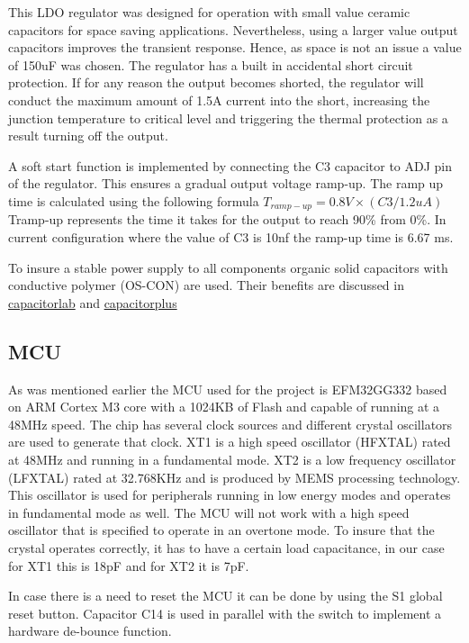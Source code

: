 This LDO regulator was designed for operation with small value ceramic capacitors for space saving applications. Nevertheless, using a larger value output capacitors improves the transient response. Hence, as space is not an issue a value of 150uF was chosen. The regulator has a built in accidental short circuit protection. If for any reason the output becomes shorted, the regulator will conduct the maximum amount of 1.5A current into the short, increasing the junction temperature to critical level and triggering the thermal protection as a result turning off the output. 

A soft start function is implemented by connecting the C3 capacitor to ADJ pin of the regulator. This ensures a gradual output voltage ramp-up. The ramp up time is calculated using the following formula $T_{ramp-up} = 0.8V × (C3/1.2uA)$ Tramp-up represents the time it takes for the output to reach 90\% from 0\%. In current configuration where the value of C3 is 10nf the ramp-up time is 6.67 ms.

To insure a stable power supply to all components organic solid capacitors with conductive polymer (OS-CON) are used. Their benefits are discussed in 
\href{http://www.capacitorlab.com/capacitor-types-polymer/}{capacitorlab}  and  \href{http://www.capacitorsplus.com/whatis.htm}{capacitorplus}


\subsection{MCU}
As was mentioned earlier the MCU used for the project is EFM32GG332 based on ARM Cortex M3 core with a 1024KB of Flash and capable of running at a 48MHz speed. The chip has several clock sources and different crystal oscillators are used to generate that clock. XT1 is a high speed oscillator (HFXTAL) rated at 48MHz and running in a fundamental mode. XT2 is a low frequency oscillator (LFXTAL) rated at 32.768KHz and is produced by MEMS processing technology. This oscillator is used for peripherals running in low energy modes and operates in fundamental mode as well. The MCU will not work with a high speed oscillator that is specified to operate in an overtone mode. To insure that the crystal operates correctly, it has to have a certain load capacitance, in our case for XT1 this is 18pF and for XT2 it is 7pF. 

In case there is a need to reset the MCU it can be done by using the S1 global reset button. Capacitor C14 is used in parallel with the switch to implement a hardware de-bounce function. 

